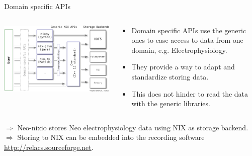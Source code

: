 \documentclass[pdftex]{beamer}
\begin{document}
\begin{frame}{Domain specific APIs}
    \begin{columns}
        \begin{column}{6cm}
            \includegraphics[width=\columnwidth]{resources/nix_apis}
        \end{column}
        \begin{column}{6.5cm}
            \begin{itemize}
                \item Domain specific APIs use the generic ones to ease access to data from one domain, e.g. Electrophysiology.
                \vspace{1ex}
                \item They provide a way to adapt and standardize storing data.
                \item This does not hinder to read the data with the generic libraries.
            \end{itemize}
        \end{column}
    \end{columns}
    \vspace{2ex}
    $\Rightarrow$ Neo-nixio stores Neo electrophysiology data using NIX as storage backend.\\
    \vspace{1ex}
    $\Rightarrow$ Storing to NIX can be embedded into the recording software \url{http://relacs.sourceforge.net}.
\end{frame}
\end{document}
